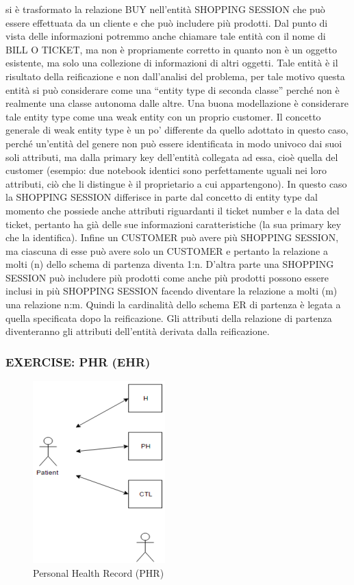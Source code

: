 si è trasformato la relazione BUY nell’entità SHOPPING SESSION che può essere effettuata da un cliente e che può includere più prodotti. Dal punto di vista delle informazioni potremmo anche chiamare tale entità con il nome di BILL O TICKET, ma non è propriamente corretto in quanto non è un oggetto esistente, ma solo una collezione di informazioni di altri oggetti. 
Tale entità è il risultato della reificazione e non dall’analisi del problema, per tale motivo questa entità si può considerare come una “entity type di seconda classe” perché non è realmente una classe autonoma dalle altre. Una buona modellazione è considerare tale entity type come una weak entity con un proprio customer. 
Il concetto generale di weak entity type è un po’ differente da quello adottato in questo caso, perché un’entità del genere non può essere identificata in modo univoco dai suoi soli attributi, ma dalla primary key dell’entità collegata ad essa, cioè quella del customer (esempio: due notebook identici sono perfettamente uguali nei loro attributi, ciò che li distingue è il proprietario a cui appartengono). 
In questo caso la SHOPPING SESSION differisce in parte dal concetto di entity type dal momento che possiede anche attributi riguardanti il ticket number e la data del ticket, pertanto ha già delle sue informazioni caratteristiche (la sua primary key che la identifica). 
Infine un CUSTOMER può avere più SHOPPING SESSION, ma ciascuna di esse può avere solo un CUSTOMER e pertanto la relazione a molti (n) dello schema di partenza diventa 1:n. D’altra parte una SHOPPING SESSION può includere più prodotti come anche più prodotti possono essere inclusi in più SHOPPING SESSION facendo diventare la relazione a molti (m) una relazione n:m. Quindi la cardinalità dello schema ER di partenza è legata a quella specificata dopo la reificazione. Gli attributi della relazione di partenza diventeranno gli attributi dell’entità derivata dalla reificazione.  

\subsubsection{EXERCISE: PHR (EHR)}

\begin{center}
\begin{figure}[H]
\centering
\includegraphics[scale=1]{figures/phr.png}
\caption{Personal Health Record (PHR)}
\end{figure}
\end{center}

